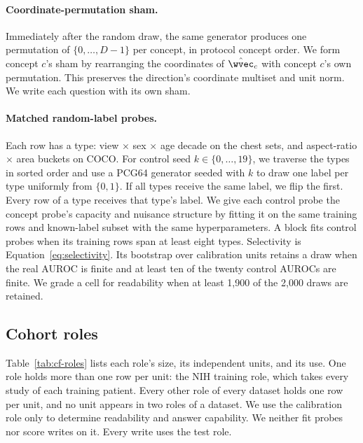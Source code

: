 \paragraph{Coordinate-permutation sham.} Immediately after the random draw, the same generator produces one permutation of $\{0,\dots,D{-}1\}$ per concept, in protocol concept order. We form concept $c$'s sham by rearranging the coordinates of $\hat\wvec_c$ with concept $c$'s own permutation. This preserves the direction's coordinate multiset and unit norm. We write each question with its own sham.

\paragraph{Matched random-label probes.} Each row has a type: view $\times$ sex $\times$ age decade on the chest sets, and aspect-ratio $\times$ area buckets on COCO. For control seed $k\in\{0,\dots,19\}$, we traverse the types in sorted order and use a PCG64 generator seeded with $k$ to draw one label per type uniformly from $\{0,1\}$. If all types receive the same label, we flip the first. Every row of a type receives that type's label. We give each control probe the concept probe's capacity and nuisance structure by fitting it on the same training rows and known-label subset with the same hyperparameters. A block fits control probes when its training rows span at least eight types. Selectivity is Equation~\ref{eq:selectivity}. Its bootstrap over calibration units retains a draw when the real AUROC is finite and at least ten of the twenty control AUROCs are finite. We grade a cell for readability when at least 1{,}900 of the 2{,}000 draws are retained.

\subsection{Cohort roles}
\label{app:repro-cohorts}

Table~\ref{tab:cf-roles} lists each role's size, its independent units, and its use. One role holds more than one row per unit: the NIH training role, which takes every study of each training patient. Every other role of every dataset holds one row per unit, and no unit appears in two roles of a dataset. We use the calibration role only to determine readability and answer capability. We neither fit probes nor score writes on it. Every write uses the test role.

